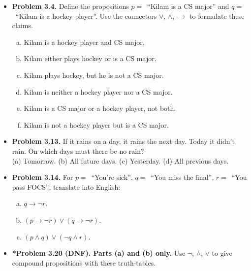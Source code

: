 \documentclass[11pt]{article}
\def\OR{\vee}
\def\AND{\wedge}
\def\imp{\rightarrow}
\begin{document}
\begin{itemize}
\item \textbf{Problem 3.4.}
  Define the propositions $p=$~``Kilam is a CS major''
  and $q=$~``Kilam is a hockey player''.
  Use the connectors $\OR$, $\AND$, $\imp$ to formulate these claims.
  \begin{enumerate}[(a)]
  \item Kilam is a hockey player and CS major.
  \item Kilam either plays hockey or is a CS major.
  \item Kilam plays hockey, but he is not a CS major.
  \item Kilam is neither a hockey player nor a CS major.
  \item Kilam is a CS major or a hockey player, not both.
  \item Kilam is not a hockey player but is a CS major.
  \end{enumerate}

\vspace{0.1in}

\item \textbf{Problem 3.13.}
  If it rains on a day, it rains the next day.
  Today it didn't rain.
  On which days must there be no rain? \\
  (a) Tomorrow.
  (b) All future days.
  (c) Yesterday.
  (d) All previous days.

\vspace{0.1in}

\item \textbf{Problem 3.14.}
  For $p=$~``You're sick'', $q=$~``You miss the final'',
  $r=$~``You pass FOCS'', translate into English:
  \begin{enumerate}[(a)]
  \item $q\imp\neg r$.
  \item $(p\imp\neg r)\OR(q\imp\neg r)$.
  \item $(p\AND q)\OR(\neg q\AND r)$.
  \end{enumerate}

\newpage

\item \textbf{*Problem 3.20 (DNF). Parts (a) and (b) only.}
  Use $\neg$, $\AND$, $\OR$ to give compound propositions with these truth-tables.


\end{itemize}
\end{document}
